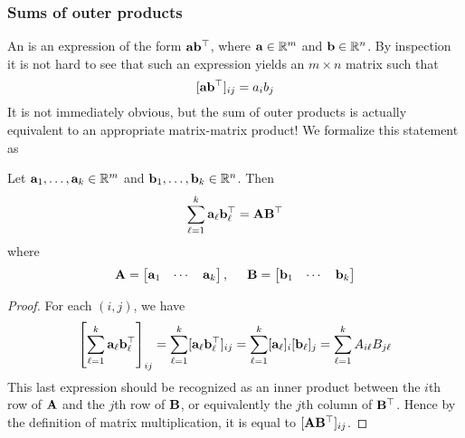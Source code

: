 \subsubsection{Sums of outer products}
An  is an expression of the form $\mathbf{a}\mathbf{b}^\top$, where $\mathbf{a} \in \mathbb{R}^m$ and $\mathbf{b} \in \mathbb{R}^n$.
By inspection it is not hard to see that such an expression yields an $m \times n$ matrix such that
\[[\mathbf{a}\mathbf{b}^\top]_{ij} = a_ib_j\]
It is not immediately obvious, but the sum of outer products is actually equivalent to an appropriate matrix-matrix product!
We formalize this statement as
\begin{proposition}
Let $\mathbf{a}_1, \dots, \mathbf{a}_k \in \mathbb{R}^m$ and $\mathbf{b}_1, \dots, \mathbf{b}_k \in \mathbb{R}^n$. Then
\[\sum_{\ell=1}^k \mathbf{a}_\ell\mathbf{b}_\ell^\top = \mathbf{A}\mathbf{B}^\top\]
where
\[\mathbf{A} = \begin{bmatrix}\mathbf{a}_1 & \cdots & \mathbf{a}_k\end{bmatrix}, \hspace{0.5cm} \mathbf{B} = \begin{bmatrix}\mathbf{b}_1 & \cdots & \mathbf{b}_k\end{bmatrix}\]
\end{proposition}
\begin{proof}
For each $(i,j)$, we have
\[\left[\sum_{\ell=1}^k \mathbf{a}_\ell\mathbf{b}_\ell^\top\right]_{ij} = \sum_{\ell=1}^k [\mathbf{a}_\ell\mathbf{b}_\ell^\top]_{ij} = \sum_{\ell=1}^k [\mathbf{a}_\ell]_i[\mathbf{b}_\ell]_j = \sum_{\ell=1}^k A_{i\ell}B_{j\ell}\]
This last expression should be recognized as an inner product between the $i$th row of $\mathbf{A}$ and the $j$th row of $\mathbf{B}$, or equivalently the $j$th column of $\mathbf{B}^\top$.
Hence by the definition of matrix multiplication, it is equal to $[\mathbf{A}\mathbf{B}^\top]_{ij}$.
\end{proof}
